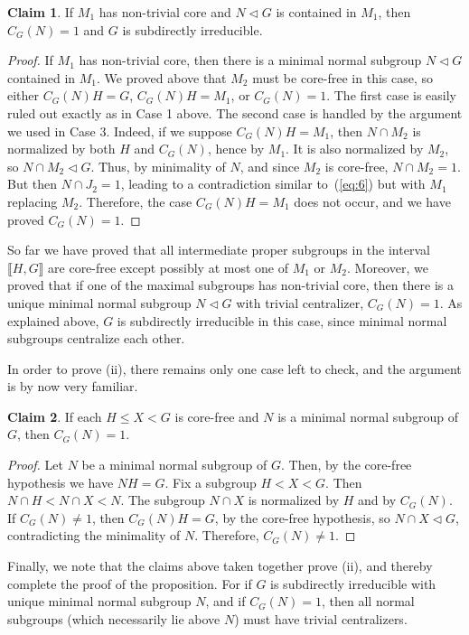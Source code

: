 \documentclass{gen-j-l}
\newcommand{\lb}{\ensuremath{\llbracket}}
\newcommand{\rb}{\ensuremath{\rrbracket}}
\newcommand{\<}{\ensuremath{\langle}}
\renewcommand{\>}{\ensuremath{\rangle}}
\theoremstyle{plain}
\theoremstyle{definition}
\newcounter{claim}
\newtheorem{claim}[claim]{Claim}
\theoremstyle{remark}
\numberwithin{theorem}{section}
\numberwithin{claim}{section}
\numberwithin{equation}{section}
\numberwithin{conjecture}{section}
\renewcommand{\leq}{\ensuremath{\leqslant}}
\newcommand{\ssubnormal}{\ensuremath{\vartriangleleft}}
\newcommand{\2}{\ensuremath{\mathbf{2}}}
\newcommand{\3}{\ensuremath{\mathbf{3}}}
\begin{document}
\begin{claim}
If $M_1$ has non-trivial core
  and $N\ssubnormal G$ is contained in $M_1$, then
  $C_G(N)=1$ and $G$ is subdirectly irreducible.
\end{claim}
\begin{proof}
If $M_1$ has non-trivial core, then there is a minimal normal
subgroup $N\ssubnormal G$ contained in $M_1$.  We proved above that
$M_2$ must be core-free in this case, so either $C_G(N)H  = G$, 
$C_G(N)H  = M_1$, 
or $C_G(N)=1$.  The first case is easily ruled out exactly as in Case 1 above. 
The second case is handled by the argument we used in Case 3.  Indeed, if we suppose 
$C_G(N)H = M_1$, 
then 
$N\cap M_2$ 
is normalized by both $H$ and $C_G(N)$, hence by
$M_1$.  It is also normalized by $M_2$, so 
$N\cap M_2\ssubnormal G$.  Thus, by minimality of $N$, 
and since $M_2$ is core-free,
$N\cap M_2 = 1$.  But then $N\cap J_2 = 1$,
leading to a contradiction similar to~(\ref{eq:6}) but with $M_1$ replacing $M_2$.  
Therefore, the case 
$C_G(N)H = M_1$ does not occur, and we have proved $C_G(N)=1$. 
\end{proof}


So far we have proved that all intermediate proper subgroups in the interval $\lb H, G \rb$
are core-free except possibly at most one of $M_1$ or $M_2$.  Moreover, we
proved that if one of the maximal subgroups has non-trivial core, then there is
a unique minimal normal subgroup $N\ssubnormal G$ with trivial centralizer,
$C_G(N) = 1$.  As explained above, $G$ is subdirectly irreducible in this case,
since minimal normal subgroups centralize each other.

In order to prove (ii), there remains only one case left to check, and the
argument is by now very familiar.
\begin{claim}
  If each $H\leq X < G$ is core-free and $N$ is a minimal normal subgroup of
  $G$, then $C_G(N) = 1$.
\end{claim}
\begin{proof}
  Let $N$ be a minimal normal subgroup of $G$. Then, by the core-free hypothesis
  we have $NH = G$. Fix a subgroup $H< X < G$.  Then $N\cap H < N\cap X < N$.
  The subgroup $N\cap X$ is normalized by $H$ and by 
  $C_G(N)$.  If $C_G(N) \neq 1$, then $C_G(N)H = G$, by the core-free
  hypothesis, so $N\cap X\ssubnormal G$, contradicting the minimality of $N$.  
  Therefore, $C_G(N) \neq 1$.
\end{proof}
Finally, we note that the claims above taken together prove (ii), and thereby
complete the proof of the proposition.  For if $G$ is subdirectly irreducible with
unique minimal normal subgroup $N$, and if $C_G(N) = 1$, then all normal
subgroups (which necessarily lie above $N$) must have trivial centralizers. 
\end{document}
